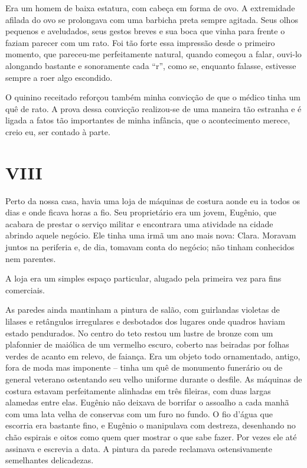 Era um homem de baixa estatura, com cabeça em forma de ovo. A extremidade afilada do ovo se prolongava com uma barbicha preta sempre agitada. Seus olhos pequenos e aveludados, seus gestos breves e sua boca que vinha para frente o faziam parecer com um rato. Foi tão forte essa impressão desde o primeiro momento, que pareceu-me perfeitamente natural, quando começou a falar, ouvi-lo alongando bastante e sonoramente cada ``r'', como se, enquanto falasse, estivesse sempre a roer algo escondido.

O quinino receitado reforçou também minha convicção de que o médico tinha um quê de rato. A prova dessa convicção realizou-se de uma maneira tão estranha e é ligada a fatos tão importantes de minha infância, que o acontecimento merece, creio eu, ser contado à parte.


\chapter*{\centering\Large{VIII}}

Perto da nossa casa, havia uma loja de máquinas de costura aonde eu ia todos os dias e onde ficava horas a fio. Seu proprietário era um jovem, Eugênio, que acabara de prestar o serviço militar e encontrara uma atividade na cidade abrindo aquele negócio. Ele tinha uma irmã um ano mais nova: Clara. Moravam juntos na periferia e, de dia, tomavam conta do negócio; não tinham conhecidos nem parentes.

A loja era um simples espaço particular, alugado pela primeira vez para fins comerciais.

As paredes ainda mantinham a pintura de salão, com guirlandas violetas de lilases e retângulos irregulares e desbotados dos lugares onde quadros haviam estado pendurados. No centro do teto restou um lustre de bronze com um plafonnier de maiólica de um vermelho escuro, coberto nas beiradas por folhas verdes de acanto em relevo, de faiança. Era um objeto todo ornamentado, antigo, fora de moda mas imponente -- tinha um quê de monumento funerário ou de general veterano ostentando seu velho uniforme durante o desfile. 
As máquinas de costura estavam perfeitamente alinhadas em três fileiras, com duas largas alamedas entre elas. Eugênio não deixava de borrifar o assoalho a cada manhã com uma lata velha de conservas com um furo no fundo. O fio d’água que escorria era bastante fino, e Eugênio o manipulava com destreza, desenhando no chão espirais e oitos como quem quer mostrar o que sabe fazer. Por vezes ele até assinava e escrevia a data. A pintura da parede reclamava ostensivamente semelhantes delicadezas.

